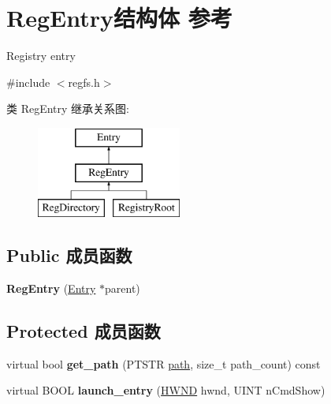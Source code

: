 \hypertarget{struct_reg_entry}{}\section{Reg\+Entry结构体 参考}
\label{struct_reg_entry}


Registry entry  




{\ttfamily \#include $<$regfs.\+h$>$}

类 Reg\+Entry 继承关系图\+:\begin{figure}[H]
\begin{center}
\leavevmode
\includegraphics[height=3.000000cm]{struct_reg_entry}
\end{center}
\end{figure}
\subsection*{Public 成员函数}
\begin{DoxyCompactItemize}
\item 
\mbox{\label{struct_reg_entry_a1009b1c18b950acd36ce88e6aa217ca3}} 
{\bfseries Reg\+Entry} (\hyperlink{struct_entry}{Entry} $\ast$parent)
\end{DoxyCompactItemize}
\subsection*{Protected 成员函数}
\begin{DoxyCompactItemize}
\item 
\mbox{\label{struct_reg_entry_af75f1494e790b1be6f5b8e1d93358d49}} 
virtual bool {\bfseries get\+\_\+path} (P\+T\+S\+TR \hyperlink{structpath}{path}, size\+\_\+t path\+\_\+count) const
\item 
\mbox{\label{struct_reg_entry_aff8082ef07837fbac08d375c39ac5175}} 
virtual B\+O\+OL {\bfseries launch\+\_\+entry} (\hyperlink{interfacevoid}{H\+W\+ND} hwnd, U\+I\+NT n\+Cmd\+Show)
\end{DoxyCompactItemize}
